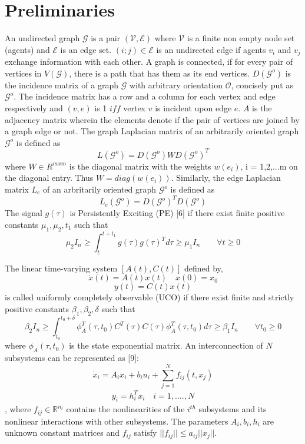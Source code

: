 \documentclass[journal]{IEEEtran}
\begin{document}
\section{Preliminaries}

An undirected graph $\mathcal{G}$ is a pair $(\mathcal{V}, \mathcal{E})$ where $\mathcal{V}$ is a finite non empty
node set (agents) and $\mathcal{E}$ is an edge set. $(i; j) \in \mathcal{E}$ is an undirected
edge if agents $v_i$ and $v_j$ exchange information with each other. A
graph is connected, if for every pair of vertices in $V(\mathcal{G})$, there is a
path that has them as its end vertices. $D(\mathcal{G}^o)$ is the incidence matrix of a graph $\mathcal{G}$ with arbitrary orientation $\mathcal{O}$, concisely put as $\mathcal{G}^o$. The  incidence matrix has a row and a column for each vertex and edge respectively and $(v,e)$ is 1 $iff$ vertex $v$ is incident upon edge $e$. $A$ is the adjacency matrix wherein the elements denote if the pair of vertices are joined by a graph edge or not. The graph Laplacian matrix of an arbitrarily oriented graph $\mathcal{G}^o$ is defined as  \begin{equation} L(\mathcal{G}^o) = D(\mathcal{G}^o)WD(\mathcal{G}^o)^T   \end{equation}where $W \in R^{mxm}$ is the diagonal matrix with the weights
$w(e_i)$, i = {1,2,...m}  on the diagonal entry. Thus $W = diag(w(e_i))$. Similarly, the edge Laplacian matrix $L_e$ of an arbritarily oriented graph $\mathcal{G}^o$ is defined as  \begin{equation}L_e(\mathcal{G}^o) = D(\mathcal{G}^o)^TD(\mathcal{G}^o) \end{equation} The signal $g(\tau)$ is Persistently Exciting (PE) [6] if there exist finite positive constants $\mu_1, \mu_2, t_1$ such that  \begin{equation}  \mu_2I_n \geq \int_{t}^{t+t_1} g(\tau)g(\tau)^Td\tau \geq \mu_1I_n \qquad \forall t \geq 0 \end{equation}

The linear time-varying system $[A(t),C(t)]$ defined by, $$ \dot{x}(t) = A(t)x(t) \quad x(0) = x_0$$ \begin{equation}y(t) = C(t)x(t) \end{equation} is called uniformly completely observable (UCO) if there exist finite and strictly positive constants $\beta_1,\beta_2, \delta $ such that $$ \beta_2I_n \geq \int_{t_0}^{t_0+\delta} \phi_A^T(\tau,t_0)C^T(\tau)C(\tau)\phi_A^T(\tau,t_0)d\tau \geq \beta_1I_n \qquad \forall t_0 \geq 0$$ where $\phi_A(\tau,t_0)$ is the state exponential matrix. An interconnection of $N$ subsystems can be represented as [9]: $$ \dot{x}_i = A_ix_i+b_iu_i+\sum_{j=1}^{N}f_{ij}(t,x_j)$$\begin{align} y_i = h^T_ix_i \quad i=1,....,N \end{align}, where $f_{ij} \in \mathbb{R}^{n_i}$ contains the nonlinearities of the $i^{th}$ subsystems and its nonlinear interactions with other subsystems. The parameters $A_i,b_i,h_i$ are unknown constant matrices and $f_{ij}$ satisfy $||f_{ij}|| \leq a_{ij}||x_j||. $
\end{document}
